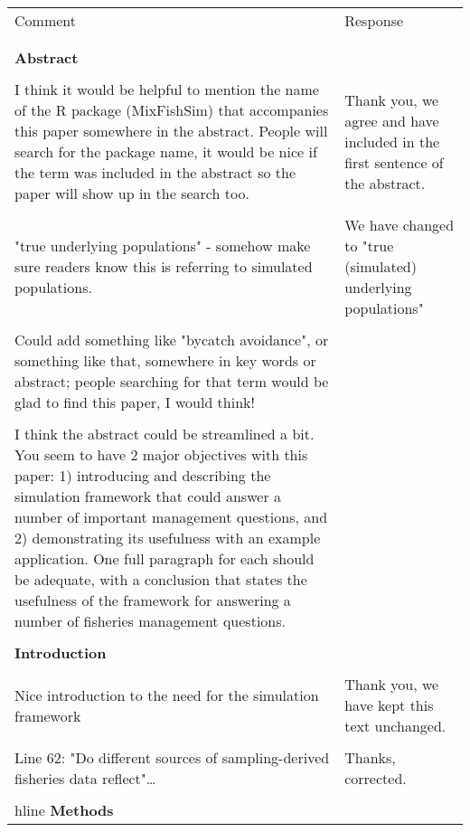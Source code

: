 \documentclass{article}
\begin{document}
\begin{landscape}
\large
	\begin{center}
	\begin{longtable}{p{12cm} | p{12cm}}
		\toprule
		Comment & Response \\
		\\
		\hline
		\\
		\textbf{Abstract} & \\
\\
I think it would be helpful to mention the name of the R package (MixFishSim)
that accompanies this paper somewhere in the abstract. People will search for
the package name, it would be nice if the term was included in the abstract so
the paper will show up in the search too. & Thank you, we agree and have
included in the first sentence of the abstract. \\
\\
"true underlying populations" - somehow make sure readers know this is
referring to simulated populations. & We have changed to "true (simulated)
underlying populations" \\
\\
Could add something like "bycatch avoidance", or something like that, somewhere
in key words or abstract; people searching for that term would be glad to find
this paper, I would think! & \\
\\
I think the abstract could be streamlined a bit. You seem to have 2 major
objectives with this paper: 1) introducing and describing the simulation
framework that could answer a number of important management questions, and 2)
demonstrating its usefulness with an example application. One full paragraph
for each should be adequate, with a conclusion that states the usefulness of
the framework for answering a number of fisheries management questions.  & \\
\\
		\hline
		\textbf{Introduction} &  \\
\\
Nice introduction to the need for the simulation framework & Thank you, we have
kept this text unchanged. \\
\\
Line 62: "Do different sources of sampling-derived fisheries data reflect"… &
Thanks, corrected. \\
\\
		hline
		\textbf{Methods} &  \\

\end{longtable}
\end{center}
\end{landscape}
\end{document}
